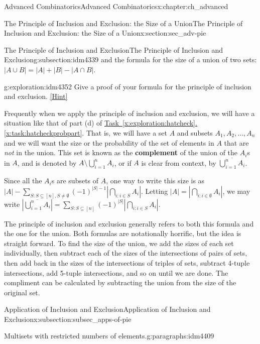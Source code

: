 \documentclass[oneside,10pt,]{book}
\newcommand{\terminology}[1]{\textbf{#1}}
\numberwithin{equation}{chapter}
\newcommand{\card}[1]{\left| #1 \right|}
\begin{document}
\begin{chapterptx}{Advanced Combinatorics}{}{Advanced Combinatorics}{}{}{x:chapter:ch_advanced}
\begin{sectionptx}{The Principle of Inclusion and Exclusion: the Size of a Union}{}{The Principle of Inclusion and Exclusion: the Size of a Union}{}{}{x:section:sec_adv-pie}
\begin{subsectionptx}{The Principle of Inclusion and Exclusion}{}{The Principle of Inclusion and Exclusion}{}{}{g:subsection:idm4339}
and the formula for the size of a union of two sets: \(\card{A \cup B} = \card{A} + \card{B} - \card{A\cap B}\).%
\begin{exploration}{}{g:exploration:idm4352}%
Give a proof of your formula for the principle of inclusion and exclusion.%
\space\hspace*{0pt}\hfill{\tiny\hyperlink{g:hint:idm4355-back}{[Hint]}}\end{exploration}
Frequently when we apply the principle of inclusion and exclusion, we will have a situation like that of part (d) of \hyperref[x:task:hatcheckprobpart]{Task~\ref{x:exploration:hatcheck}.\ref{x:task:hatcheckprobpart}}.  That is, we will have a set \(A\) and subsets \(A_1, A_2, \ldots, A_n\) and we will want the size or the probability of the set of elements in \(A\) that are \emph{not} in the union.  This set is known as the \terminology{complement}  of the union of the \(A_i\)s in \(A\), and is denoted by \(A \setminus \bigcup_{i=1}^n A_i\), or if \(A\) is clear from context, by \(\overline{\bigcup_{i=1}^n A_i}\).%
\par
Since all the \(A_i\)s are subsets of \(A\), one way to write this size is as \(|A| - \sum_{S:S \subseteq [n], S \ne \emptyset}(-1)^{|S|-1} |\bigcap_{i:i \in S}A_i|\).  Letting \(|A| = \left|\bigcap_{i:i \in \emptyset} A_i\right|\), we may write \(\left|\overline{\bigcup_{i=1}^n A_i}\right| = \sum_{S:S \subseteq [n]} (-1)^{|S|}\left| \bigcap_{i:i\in S} A_i\right|\).%
\par
The principle of inclusion and exclusion generally refers to both this formula and the one for the union.  Both formulas are notationally horrific, but the idea is straight forward.  To find the size of the union, we add the sizes of each set individually, then subtract each of the sizes of the intersections of pairs of sets, then add back in the sizes of the intersections of triples of sets, subtract 4-tuple intersections, add 5-tuple intersections, and so on until we are done.  The compliment can be calculated by subtracting the union from the size of the original set.%
\end{subsectionptx}
%
%
\typeout{************************************************}
\typeout{************************************************}
%
\begin{subsectionptx}{Application of Inclusion and Exclusion}{}{Application of Inclusion and Exclusion}{}{}{x:subsection:subsec_apps-of-pie}
\begin{paragraphs}{Multisets with restricted numbers of elements.}{g:paragraphs:idm4409}%

\end{paragraphs}
\end{subsectionptx}
\end{sectionptx}
\end{chapterptx}
\end{document}
